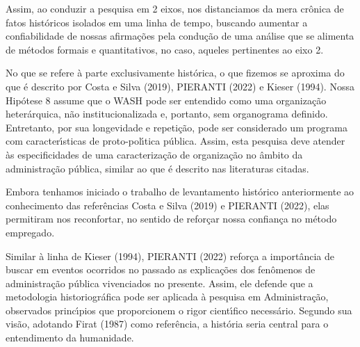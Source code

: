 \documentclass[
12pt,		%
openright,	%
twoside,  %
a4paper,			%
chapter=TITLE,		%
english,			%
french,				%
spanish,			%
brazil				%
]{USPSC-classe/USPSC}
\begin{document}
Assim, ao conduzir a pesquisa em 2 eixos, nos distanciamos da mera cr\^onica de fatos hist\'oricos isolados em uma linha de tempo, buscando aumentar a confiabilidade de nossas afirma\c{c}\~oes pela condu\c{c}\~ao de uma an\'alise que se alimenta de m\'etodos formais e quantitativos, no caso, aqueles pertinentes ao eixo 2.










No que se refere \`a parte exclusivamente hist\'orica, o que fizemos se aproxima do que \'e descrito por   Costa e Silva (2019), PIERANTI (2022) e  Kieser (1994). Nossa Hip\'otese 8 assume que o WASH pode ser entendido como uma organiza\c{c}\~ao heter\'arquica, n\~ao institucionalizada e, portanto, sem organograma definido. Entretanto, por sua longevidade e repeti\c{c}\~ao, pode ser considerado um programa com caracter\'{\i}sticas de proto-pol\'{\i}tica p\'ublica. Assim, esta pesquisa deve atender \`as especificidades de uma caracteriza\c{c}\~ao de organiza\c{c}\~ao no \^ambito da administra\c{c}\~ao p\'ublica, similar ao que \'e descrito nas literaturas citadas.










Embora tenhamos iniciado o trabalho de levantamento hist\'orico anteriormente ao conhecimento das refer\^encias  Costa e Silva (2019) e  PIERANTI (2022), elas permitiram nos reconfortar, no sentido de refor\c{c}ar nossa confian\c{c}a no m\'etodo empregado.










Similar \`a linha de  Kieser (1994),  PIERANTI (2022) refor\c{c}a a import\^ancia de buscar em eventos ocorridos no passado as explica\c{c}\~oes dos fen\^omenos de administra\c{c}\~ao p\'ublica vivenciados no presente. Assim, ele defende que \textquotedbl a metodologia historiogr\'afica pode ser aplicada \`a pesquisa em Administra\c{c}\~ao\textquotedbl , observados princ\'{\i}pios que proporcionem o rigor cient\'{\i}fico necess\'ario. Segundo sua vis\~ao, adotando  Firat (1987) como refer\^encia, a hist\'oria seria \textquotedbl central para o entendimento da humanidade\textquotedbl .
\end{document}
